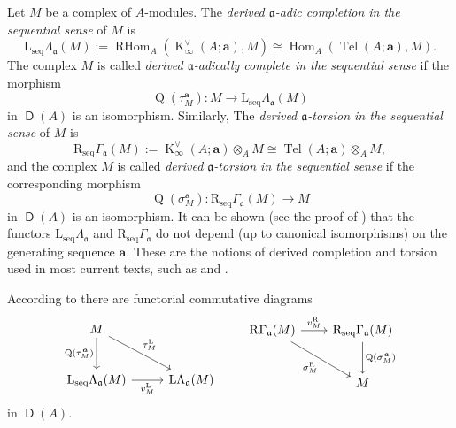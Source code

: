 \documentclass[10pt]{amsart}
\theoremstyle{definition}
\numberwithin{equation}{section}
\newcommand{\opn}{\operatorname}
\newcommand{\cat}[1]{\operatorname{\mathsf{#1}}}
\newcommand{\mfrak}[1]{\mathfrak{#1}}
\newcommand{\mrm}[1]{\mathrm{#1}}
\newcommand{\Ga}{\Gamma}
\newcommand{\si}{\sigma}
\newcommand{\La}{\Lambda}
\renewcommand{\a}{\mfrak{a}}
\newcommand{\ba}{\bsym{a}}
\newcommand{\bsym}[1]{\boldsymbol{#1}}
\newcommand{\ot}{\otimes}
\newcommand{\msp}[1]{\mspace{#1 mu}}
\begin{document}
Let $M$ be a complex of $A$-modules.
The {\em derived $\a$-adic completion in the sequential sense} of $M$  is
\begin{equation} \label{eqn:338}
\mrm{L}_{\mrm{seq}} \La_{\a} (M) :=
\opn{RHom}_A(\opn{K}_{\infty}^{\vee}(A; \ba), M) \cong
\opn{Hom}_A(\opn{Tel}(A; \ba), M) .
\end{equation}
The complex $M$ is called {\em derived $\a$-adically complete in
the sequential sense} if the morphism
\begin{equation} \label{eqn:339}
\opn{Q}(\tau^{\ba}_{M}) : M \to \mrm{L}_{\mrm{seq}} \La_{\a} (M)
\end{equation}
in $\cat{D}(A)$ is an isomorphism.
Similarly, The {\em derived $\a$-torsion in the sequential sense} of $M$  is
\begin{equation} \label{eqn:340}
\mrm{R}_{\mrm{seq}} \Ga_{\a} (M) :=
\opn{K}^{\vee}_{\infty}(A; \ba) \ot_A M \cong
\opn{Tel}(A; \ba) \ot_A M ,
\end{equation}
and the complex $M$ is called {\em derived $\a$-torsion in
the sequential sense} if the corresponding morphism
\begin{equation} \label{eqn:341}
\opn{Q}(\si^{\ba}_{M}) :  \mrm{R}_{\mrm{seq}} \Ga_{\a} (M) \to M
\end{equation}
in $\cat{D}(A)$ is an isomorphism.
It can be shown (see the proof of \cite[Corollary 6.2]{PSY1}) that the functors
$\mrm{L}_{\mrm{seq}} \La_{\a}$ and $\mrm{R}_{\mrm{seq}} \Ga_{\a}$ do not depend
(up to canonical isomorphisms) on the generating sequence $\ba$.
These are the notions of derived completion and torsion used in most current
texts, such as \cite{SP} and \cite{BS}.

According to \cite[Corollaries 4.26 and 5.25]{PSY1} there are functorial
commutative diagrams
\begin{equation} \label{eqn:270}
\begin{tikzcd} [column sep = 6ex, row sep = 6ex]
M
\ar[dr, "{\tau^{\mrm{L}}_{M}}"]
\ar[d, "{\opn{Q}(\tau^{\msp{2} \ba}_{M})}"']
\\
\mrm{L}_{\mrm{seq}} \La_{\a} (M)
\ar[r, "{v^{\mrm{L}}_{M}}"']
&
\mrm{L} \La_{\a}(M)
\end{tikzcd}
\qquad
\begin{tikzcd} [column sep = 5ex, row sep = 6ex]
\mrm{R}_{} \Ga_{\a} (M)
\ar[r, "{v^{\mrm{R}}_{M}}"]
\ar[dr, "{\si^{\mrm{R}}_{M}}"']
&
\mrm{R}_{\mrm{seq}} \Ga_{\a} (M)
\ar[d, "{\opn{Q}(\si^{\msp{2} \ba}_{M})}"]
\\
&
M
\end{tikzcd}
\end{equation}
in $\cat{D}(A)$.
\end{document}
